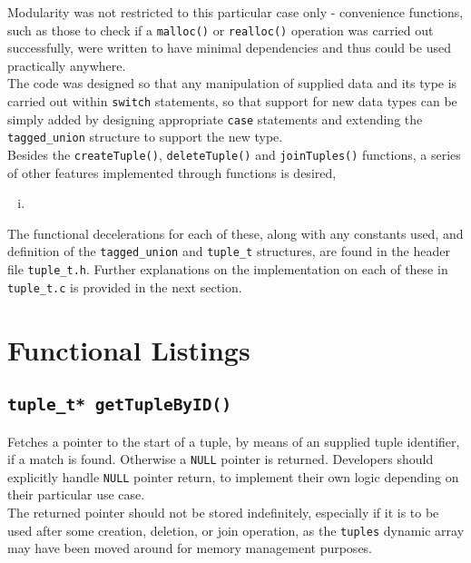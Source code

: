 \documentclass[10pt, a4paper, oneside]{memoir}
\begin{document}
	Modularity was not restricted to this particular case only - convenience functions, such as those to check if a \texttt{malloc()} or \texttt{realloc()} operation was carried out successfully, were written to have minimal dependencies and thus could be used practically anywhere.\\
	
	The code was designed so that any manipulation of supplied data and its type is carried out within \texttt{switch} statements, so that support for new data types can be simply added by designing appropriate \texttt{case} statements and extending the \texttt{tagged_union} structure to support the new type.\\
	
	Besides the \texttt{createTuple()}, \texttt{deleteTuple()} and \texttt{joinTuples()} functions, a series of other features implemented through functions is desired,
	\begin{enumerate}[i.]
		\item 
	\end{enumerate}

	The functional decelerations for each of these, along with any constants used, and definition of the \texttt{tagged_union} and \texttt{tuple_t} structures, are found in the header file \texttt{tuple_t.h}. Further explanations on the implementation on each of these in \texttt{tuple_t.c} is provided in the next section.
	
	\newpage
	
	\section{Functional Listings}
	
	\subsection{\texttt{tuple_t* getTupleByID()}}
	
	Fetches a pointer to the start of a tuple, by means of an supplied tuple identifier, if a match is found. Otherwise a \texttt{NULL} pointer is returned. Developers should explicitly handle \texttt{NULL} pointer return, to implement their own logic depending on their particular use case.\\
	 
	The returned pointer should not be stored indefinitely, especially if it is to be used after some creation, deletion, or join operation, as the \texttt{tuples} dynamic array may have been moved around for memory management purposes.\\
	
\end{document}
